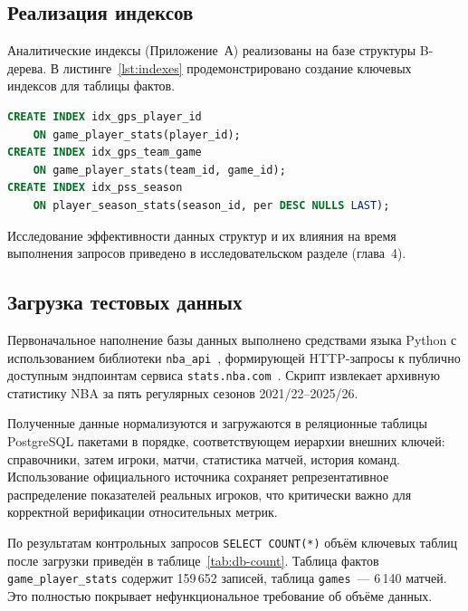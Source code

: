 \subsection{Реализация индексов}

Аналитические индексы (Приложение~А) реализованы на базе структуры B-дерева.
В листинге~\ref{lst:indexes} продемонстрировано создание ключевых индексов
для таблицы фактов.

\begin{lstlisting}[language=SQL, label=lst:indexes,
  caption=Создание индексов аналитических запросов (фрагмент)]
CREATE INDEX idx_gps_player_id
    ON game_player_stats(player_id);
CREATE INDEX idx_gps_team_game
    ON game_player_stats(team_id, game_id);
CREATE INDEX idx_pss_season
    ON player_season_stats(season_id, per DESC NULLS LAST);
\end{lstlisting}

Исследование эффективности данных структур и их влияния на время выполнения
запросов приведено в исследовательском разделе (глава~4).

\subsection{Загрузка тестовых данных}\label{subsec:data-load}

Первоначальное наполнение базы данных выполнено средствами языка Python
с использованием библиотеки \texttt{nba\_api}~\cite{nba-api}, формирующей
HTTP-запросы к публично доступным эндпоинтам сервиса
\texttt{stats.nba.com}~\cite{nba-stats}. Скрипт извлекает архивную
статистику NBA за пять регулярных сезонов 2021/22--2025/26.

Полученные данные нормализуются и загружаются в реляционные таблицы
PostgreSQL пакетами в порядке, соответствующем иерархии внешних ключей:
справочники, затем игроки, матчи, статистика матчей, история команд.
Использование официального источника сохраняет репрезентативное распределение
показателей реальных игроков, что критически важно для корректной верификации
относительных метрик.

По результатам контрольных запросов \texttt{SELECT COUNT(*)} объём ключевых
таблиц после загрузки приведён в таблице~\ref{tab:db-count}. Таблица фактов
\texttt{game\_player\_stats} содержит 159\,652 записей, таблица
\texttt{games}~--- 6\,140 матчей. Это полностью покрывает нефункциональное
требование об объёме данных.

